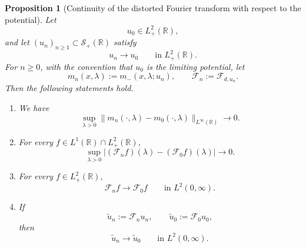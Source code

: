 \documentclass[10pt]{article}
\newtheorem{proposition}[theorem]{Proposition}
\numberwithin{equation}{section}
\numberwithin{theorem}{section}
\begin{document}
\begin{proposition}[Continuity of the distorted Fourier transform with respect to the potential]
\label{prop:continuity_Fd}
Let
\[
u_0\in L^2_+(\mathbb R),
\]
and let \((u_n)_{n\ge1}\subset \mathcal S_+(\mathbb R)\) satisfy
\[
u_n\to u_0
\qquad\text{in }L^2_+(\mathbb R).
\]
For \(n\ge0\), with the convention that \(u_0\) is the limiting potential, let
\[
m_n(x,\lambda):=m_-(x,\lambda;u_n),
\qquad
\mathcal F_n:=\mathcal F_{d,u_n}.
\]
Then the following statements hold.


\begin{enumerate}
\item We have
\[
\sup_{\lambda>0}
\|m_n(\cdot,\lambda)-m_0(\cdot,\lambda)\|_{L^\infty(\mathbb R)}
\longrightarrow0.
\]

\item For every \(f\in L^1(\mathbb R)\cap L^2_+(\mathbb R)\),
\[
\sup_{\lambda>0}
|(\mathcal F_n f)(\lambda)-(\mathcal F_0 f)(\lambda)|
\longrightarrow0.
\]

\item For every \(f\in L^2_+(\mathbb R)\),
\[
\mathcal F_n f\to \mathcal F_0f
\qquad\text{in }L^2(0,\infty).
\]

\item If
\[
\widetilde u_n:=\mathcal F_nu_n,
\qquad
\widetilde u_0:=\mathcal F_0u_0,
\]
then
\[
\widetilde u_n\to \widetilde u_0
\qquad\text{in }L^2(0,\infty).
\]

\end{enumerate}
\end{proposition}
\end{document}
